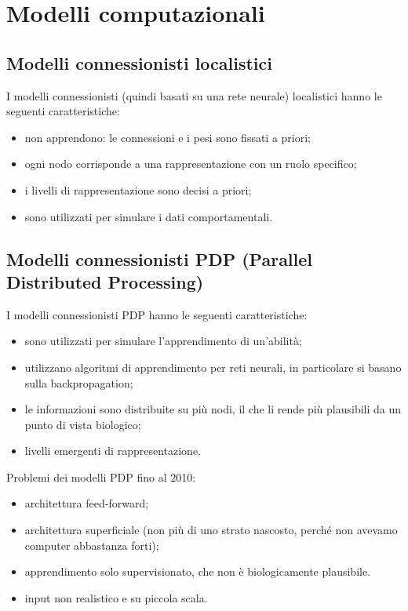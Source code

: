\section{Modelli computazionali}

\subsection{Modelli connessionisti localistici}

I modelli connessionisti (quindi basati su una rete neurale) localistici hanno
le seguenti caratteristiche:
\begin{itemize}
	\item non apprendono: le connessioni e i pesi sono fissati a priori;

	\item ogni nodo corrisponde a una rappresentazione con un ruolo specifico;

	\item i livelli di rappresentazione sono decisi a priori;

	\item sono utilizzati per simulare i dati comportamentali.
\end{itemize}

\subsection{Modelli connessionisti PDP (Parallel Distributed Processing)}

I modelli connessionisti PDP hanno le seguenti caratteristiche:
\begin{itemize}
	\item sono utilizzati per simulare l'apprendimento di un'abilità;

	\item utilizzano algoritmi di apprendimento per reti neurali, in particolare
		si basano sulla backpropagation;

	\item le informazioni sono distribuite su più nodi, il che li rende più
		plausibili da un punto di vista biologico;

	\item livelli emergenti di rappresentazione.
\end{itemize}

Problemi dei modelli PDP fino al 2010:
\begin{itemize}
	\item architettura feed-forward;

	\item architettura superficiale (non più di uno strato nascosto, perché non
		avevamo computer abbastanza forti);

	\item apprendimento solo supervisionato, che non è biologicamente 
		plausibile.

	\item input non realistico e su piccola scala.
\end{itemize}

